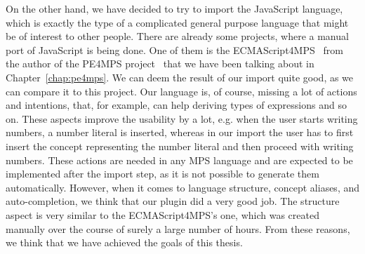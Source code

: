 On the other hand, we have decided to try to import the JavaScript language, which is exactly the type of a complicated general purpose language that might be of interest to other people.
There are already some projects, where a manual port of JavaScript is being done.
One of them is the ECMAScript4MPS~\cite{ECMAScript4MPS} from the author of the PE4MPS project~\cite{PE4MPS} that we have been talking about in Chapter~\ref{chap:pe4mps}.
We can deem the result of our import quite good, as we can compare it to this project.
Our language is, of course, missing a lot of actions and intentions, that, for example, can help deriving types of expressions and so on.
These aspects improve the usability by a lot, e.g. when the user starts writing numbers, a number literal is inserted, whereas in our import the user has to first insert the concept representing the number literal and then proceed with writing numbers.
These actions are needed in any MPS language and are expected to be implemented after the import step, as it is not possible to generate them automatically.
However, when it comes to language structure, concept aliases, and auto-completion, we think that our plugin did a very good job.
The structure aspect is very similar to the ECMAScript4MPS's one, which was created manually over the course of surely a large number of hours.
From these reasons, we think that we have achieved the goals of this thesis.
